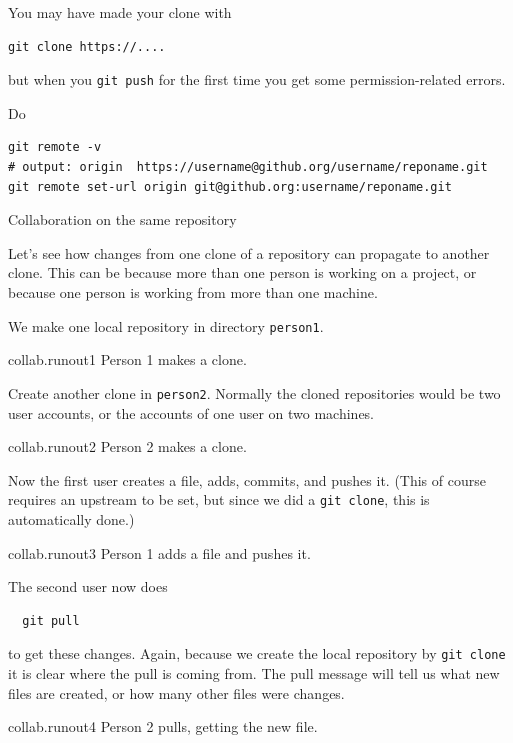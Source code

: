 You may have made your clone with
\begin{lstlisting}
git clone https://....
\end{lstlisting}
but when you \lstinline{git push} for the first time
you get some permission-related errors.

Do
\begin{lstlisting}
git remote -v
# output: origin  https://username@github.org/username/reponame.git
git remote set-url origin git@github.org:username/reponame.git
\end{lstlisting}

\newpage
{} {Collaboration on the same repository}

Let's see how changes from one clone of a repository
can propagate to another clone.
This can be because more than one person is working on a project,
or because one person is working from more than one machine.

We make one local repository in directory \lstinline{person1}.

\begin{gitstep}{collab.runout1}
  Person 1 makes a clone.
\end{gitstep}

Create another clone in \lstinline{person2}.
Normally the cloned repositories would be two user accounts,
or the accounts of one user on two machines.

\begin{gitstep}{collab.runout2}
  Person 2 makes a clone.
\end{gitstep}

Now the first user creates a file, adds, commits, and pushes it.
(This of course requires an upstream to be set,
but since we did a \lstinline{git clone},
this is automatically done.)

\begin{gitstep}{collab.runout3}
  Person 1 adds a file and pushes it.
\end{gitstep}

The second user now does
\begin{lstlisting}
  git pull
\end{lstlisting}
to get these changes.
Again, because we create the local repository by \lstinline{git clone}
it is clear where the pull is coming from.
The pull message will tell us what new files are created,
or how many other files were changes.

\begin{gitstep}{collab.runout4}
  Person 2 pulls, getting the new file.
\end{gitstep}

